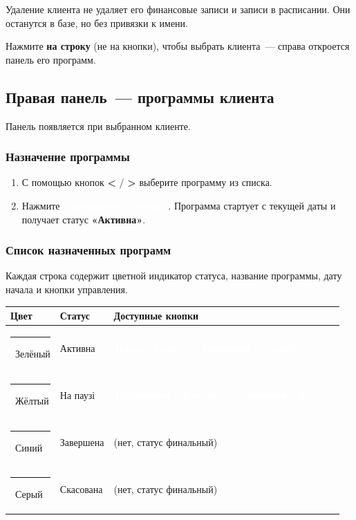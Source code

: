 \documentclass[12pt,a4paper]{article}
\newcommand{\btn}[2][primary]{%
  \textcolor{white}{\colorbox{#1}{\small\bfseries\,#2\,}}%
}
\newcommand{\btnred}[1]{\btn[danger]{#1}}
\newcommand{\btngreen}[1]{\btn[success!70!black]{#1}}
\newcommand{\btnyellow}[1]{\btn[warning!80!black]{#1}}
\begin{document}
\begin{warningbox}
  Удаление клиента не удаляет его финансовые записи и записи
  в расписании. Они останутся в базе, но без привязки к имени.
\end{warningbox}

Нажмите \textbf{на строку} (не на кнопки), чтобы выбрать клиента~---
справа откроется панель его программ.

\subsection{Правая панель~--- программы клиента}

Панель появляется при выбранном клиенте.

\subsubsection{Назначение программы}

\begin{enumerate}
  \item С помощью кнопок \textbf{<} / \textbf{>} выберите программу
    из списка.
  \item Нажмите \btngreen{Призначити / Assign}.
    Программа стартует с текущей даты и получает статус
    \textbf{«Активна»}.
\end{enumerate}

\subsubsection{Список назначенных программ}

Каждая строка содержит цветной индикатор статуса, название программы,
дату начала и кнопки управления.

\medskip
\begin{center}
\begin{tabular}{llp{6.2cm}}
  \toprule
  Цвет & Статус & Доступные кнопки \\
  \midrule
  \textcolor{success!70!black}{\rule{10pt}{10pt}}~Зелёный &
    Активна &
    \btnyellow{Пауза / Pause}~\quad~\btn{Завершити / Complete} \\[2pt]
  \textcolor{warning}{\rule{10pt}{10pt}}~Жёлтый &
    На паузі &
    \btngreen{Продовжити / Resume}~\quad~\btnred{Скасувати / Cancel} \\[2pt]
  \textcolor{primary!80!black}{\rule{10pt}{10pt}}~Синий &
    Завершена &
    (нет, статус финальный) \\[2pt]
  \textcolor{gray}{\rule{10pt}{10pt}}~Серый &
    Скасована &
    (нет, статус финальный) \\
  \bottomrule
\end{tabular}
\end{center}
\end{document}
